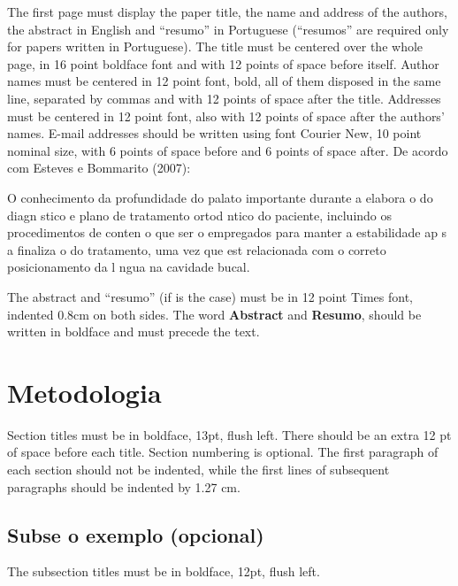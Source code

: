 \documentclass{article}
\begin{document}
The first page must display the paper title, the name and address of the
authors, the abstract in English and ``resumo'' in Portuguese (``resumos'' are
required only for papers written in Portuguese). The title must be centered
over the whole page, in 16 point boldface font and with 12 points of space
before itself. Author names must be centered in 12 point font, bold, all of
them disposed in the same line, separated by commas and with 12 points of
space after the title. Addresses must be centered in 12 point font, also with
12 points of space after the authors' names. E-mail addresses should be
written using font Courier New, 10 point nominal size, with 6 points of space
before and 6 points of space after. De acordo com Esteves e Bommarito (2007):

\vspace{.5cm}
\hfill
\begin{minipage}{.6\textwidth}
\footnotesize
O conhecimento da profundidade do palato   importante durante a elabora o do diagn stico e plano de tratamento ortod ntico do paciente, incluindo os procedimentos de conten o que ser o empregados para manter a estabilidade ap s a finaliza o do tratamento, uma vez que est  relacionada com o correto posicionamento da l ngua na cavidade bucal.
\end{minipage}
\vspace{.5cm}

The abstract and ``resumo'' (if is the case) must be in 12 point Times font,
indented 0.8cm on both sides. The word \textbf{Abstract} and \textbf{Resumo},
should be written in boldface and must precede the text.

\section{Metodologia} \label{sec:metodologia}

Section titles must be in boldface, 13pt, flush left. There should be an extra
12 pt of space before each title. Section numbering is optional. The first
paragraph of each section should not be indented, while the first lines of
subsequent paragraphs should be indented by 1.27 cm.

\subsection{Subse o exemplo  (opcional)}

The subsection titles must be in boldface, 12pt, flush left.
\end{document}
